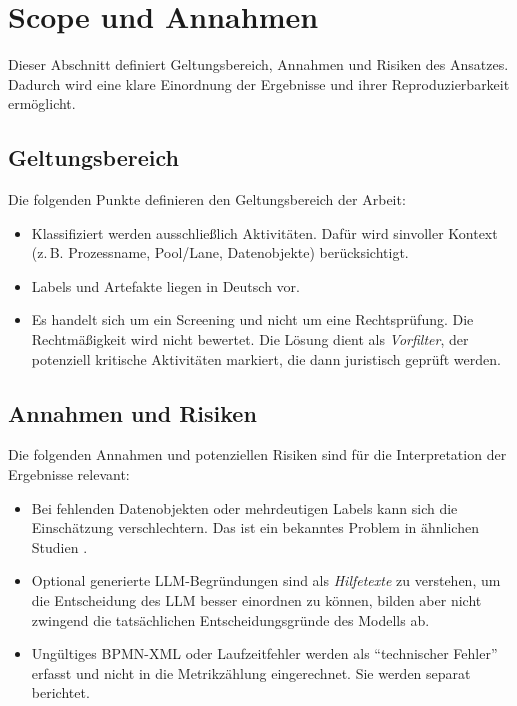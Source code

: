 \section{Scope und Annahmen}\label{sec:scope-und-annahmen}

Dieser Abschnitt definiert Geltungsbereich, Annahmen und Risiken des Ansatzes. Dadurch wird eine klare Einordnung der Ergebnisse und ihrer Reproduzierbarkeit ermöglicht.

\subsection{Geltungsbereich}

Die folgenden Punkte definieren den Geltungsbereich der Arbeit:

\begin{itemize}
    \item Klassifiziert werden ausschließlich Aktivitäten. Dafür wird sinvoller Kontext (z.\,B. Prozessname, Pool/Lane, Datenobjekte) berücksichtigt.
    \item Labels und Artefakte liegen in Deutsch vor.
    \item Es handelt sich um ein Screening und nicht um eine Rechtsprüfung. Die Rechtmäßigkeit wird nicht bewertet. Die Lösung dient als \emph{Vorfilter}, der potenziell kritische Aktivitäten markiert, die dann juristisch geprüft werden.
\end{itemize}

\subsection{Annahmen und Risiken}

Die folgenden Annahmen und potenziellen Risiken sind für die Interpretation der Ergebnisse relevant:

\begin{itemize}
    \item Bei fehlenden Datenobjekten oder mehrdeutigen Labels kann sich die Einschätzung verschlechtern. Das ist ein bekanntes Problem in ähnlichen Studien \cite{nake2023towards}.
    \item Optional generierte \ac{LLM}-Begründungen sind als \emph{Hilfetexte} zu verstehen, um die Entscheidung des \ac{LLM} besser einordnen zu können, bilden aber nicht zwingend die tatsächlichen Entscheidungsgründe des Modells ab.
    \item Ungültiges \ac{BPMN}-XML oder Laufzeitfehler werden als \enquote{technischer Fehler} erfasst und nicht in die Metrikzählung eingerechnet. Sie werden separat berichtet.
\end{itemize}
